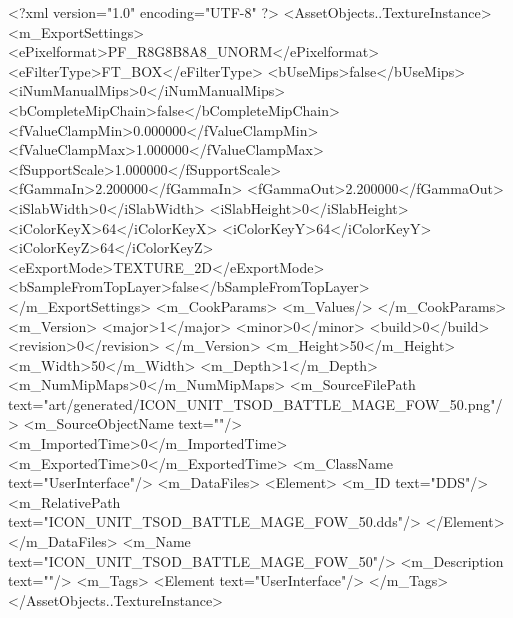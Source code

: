 <?xml version="1.0" encoding="UTF-8" ?>
<AssetObjects..TextureInstance>
	<m_ExportSettings>
		<ePixelformat>PF_R8G8B8A8_UNORM</ePixelformat>
		<eFilterType>FT_BOX</eFilterType>
		<bUseMips>false</bUseMips>
		<iNumManualMips>0</iNumManualMips>
		<bCompleteMipChain>false</bCompleteMipChain>
		<fValueClampMin>0.000000</fValueClampMin>
		<fValueClampMax>1.000000</fValueClampMax>
		<fSupportScale>1.000000</fSupportScale>
		<fGammaIn>2.200000</fGammaIn>
		<fGammaOut>2.200000</fGammaOut>
		<iSlabWidth>0</iSlabWidth>
		<iSlabHeight>0</iSlabHeight>
		<iColorKeyX>64</iColorKeyX>
		<iColorKeyY>64</iColorKeyY>
		<iColorKeyZ>64</iColorKeyZ>
		<eExportMode>TEXTURE_2D</eExportMode>
		<bSampleFromTopLayer>false</bSampleFromTopLayer>
	</m_ExportSettings>
	<m_CookParams>
		<m_Values/>
	</m_CookParams>
	<m_Version>
		<major>1</major>
		<minor>0</minor>
		<build>0</build>
		<revision>0</revision>
	</m_Version>
	<m_Height>50</m_Height>
	<m_Width>50</m_Width>
	<m_Depth>1</m_Depth>
	<m_NumMipMaps>0</m_NumMipMaps>
	<m_SourceFilePath text="art/generated/ICON_UNIT_TSOD_BATTLE_MAGE_FOW_50.png"/>
	<m_SourceObjectName text=""/>
	<m_ImportedTime>0</m_ImportedTime>
	<m_ExportedTime>0</m_ExportedTime>
	<m_ClassName text="UserInterface"/>
	<m_DataFiles>
		<Element>
			<m_ID text="DDS"/>
			<m_RelativePath text="ICON_UNIT_TSOD_BATTLE_MAGE_FOW_50.dds"/>
		</Element>
	</m_DataFiles>
	<m_Name text="ICON_UNIT_TSOD_BATTLE_MAGE_FOW_50"/>
	<m_Description text=""/>
	<m_Tags>
		<Element text="UserInterface"/>
	</m_Tags>
</AssetObjects..TextureInstance>
